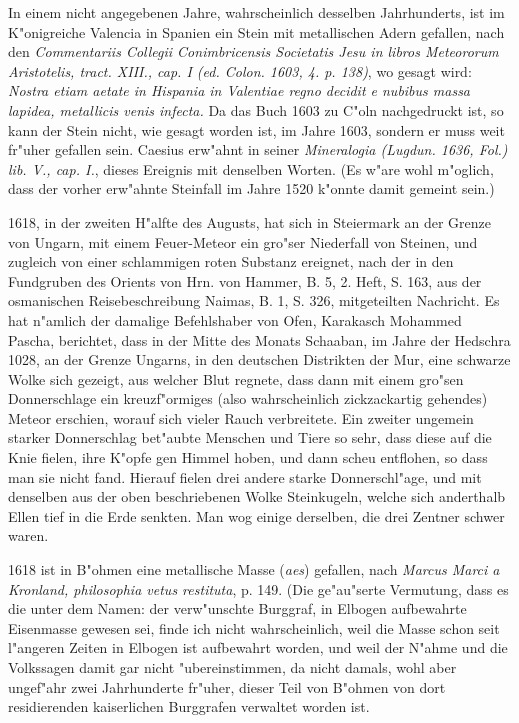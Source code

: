 \documentclass[a4paper, 11pt, oneside, polutonikogreek, german]{article}
\begin{document}
In einem nicht angegebenen Jahre, wahrscheinlich desselben Jahrhunderts, ist im K"onigreiche Valencia in Spanien ein Stein mit metallischen Adern gefallen, nach den \emph{Commentariis Collegii Conimbricensis Societatis Jesu in libros Meteororum Aristotelis, tract. XIII., cap. I (ed. Colon. 1603, 4. p. 138)}, wo gesagt wird: \emph{Nostra etiam aetate in Hispania in Valentiae regno decidit e nubibus massa lapidea, metallicis venis infecta.} Da das Buch 1603 zu C"oln nachgedruckt ist, so kann der Stein nicht, wie gesagt worden ist, im Jahre 1603, sondern er muss weit fr"uher gefallen sein. Caesius erw"ahnt in seiner \emph{Mineralogia (Lugdun. 1636, Fol.) lib. V., cap. I.}, dieses Ereignis mit denselben Worten. (Es w"are wohl m"oglich, dass der vorher erw"ahnte Steinfall im Jahre 1520 k"onnte damit gemeint sein.)

1618, in der zweiten H"alfte des Augusts, hat sich in Steiermark an der Grenze von Ungarn, mit einem Feuer-Meteor ein gro"ser Niederfall von Steinen, und zugleich von einer schlammigen roten Substanz ereignet, nach der in den Fundgruben des Orients von Hrn. von Hammer, B. 5, 2. Heft, S. 163, aus der osmanischen Reisebeschreibung Naimas, B. 1, S. 326, mitgeteilten Nachricht. Es hat n"amlich der damalige Befehlshaber von Ofen, Karakasch Mohammed Pascha, berichtet, dass in der Mitte des Monats Schaaban, im Jahre der Hedschra 1028, an der Grenze Ungarns, in den deutschen Distrikten der Mur, eine schwarze Wolke sich gezeigt, aus welcher Blut regnete, dass dann mit einem gro"sen Donnerschlage ein kreuzf"ormiges (also wahrscheinlich zickzackartig gehendes) Meteor erschien, worauf sich vieler Rauch verbreitete. Ein zweiter ungemein starker Donnerschlag bet"aubte Menschen und Tiere so sehr, dass diese auf die Knie fielen, ihre K"opfe gen Himmel hoben, und dann scheu entflohen, so dass man sie nicht fand. Hierauf fielen drei andere starke Donnerschl"age, und mit denselben aus der oben beschriebenen Wolke Steinkugeln, welche sich anderthalb Ellen tief in die Erde senkten. Man wog einige derselben, die drei Zentner schwer waren.

1618 ist in B"ohmen eine metallische Masse (\emph{aes}) gefallen, nach \emph{Marcus Marci a Kronland, philosophia vetus restituta}, p. 149. (Die ge"au"serte Vermutung, dass es die unter dem Namen: der verw"unschte Burggraf, in Elbogen aufbewahrte Eisenmasse gewesen sei, finde ich nicht wahrscheinlich, weil die Masse schon seit l"angeren Zeiten in Elbogen ist aufbewahrt worden, und weil der N"ahme und die Volkssagen damit gar nicht "ubereinstimmen, da nicht damals, wohl aber ungef"ahr zwei Jahrhunderte fr"uher, dieser Teil von B"ohmen von dort residierenden kaiserlichen Burggrafen verwaltet worden ist.
\end{document}

